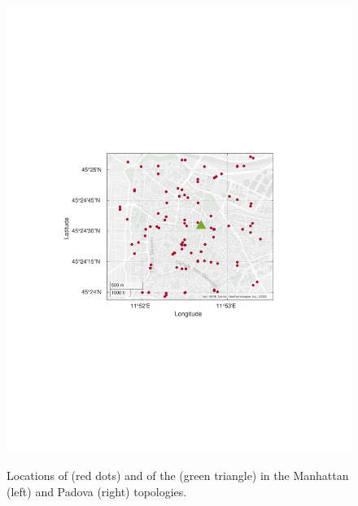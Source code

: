 \begin{figure}
{\includegraphics[scale=0.3]{Figures/Safehaul/padova_new.pdf}
    \label{fig:Padova_Map}}
    \caption{Locations of \nodes{} (red dots) and of the \donor{} (green triangle) in the Manhattan (left) and Padova (right) topologies.}
\end{figure}


